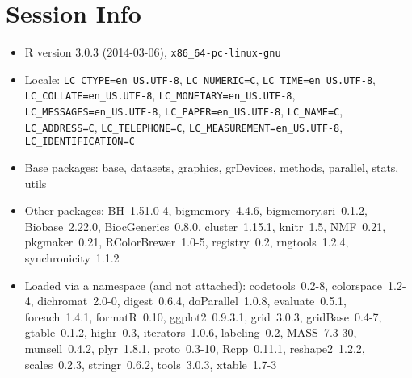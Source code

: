 \documentclass[a4paper]{article}\usepackage[]{graphicx}\usepackage[]{color}
\begin{document}
\section{Session Info}
\begin{itemize}\raggedright
  \item R version 3.0.3 (2014-03-06), \verb|x86_64-pc-linux-gnu|
  \item Locale: \verb|LC_CTYPE=en_US.UTF-8|, \verb|LC_NUMERIC=C|, \verb|LC_TIME=en_US.UTF-8|, \verb|LC_COLLATE=en_US.UTF-8|, \verb|LC_MONETARY=en_US.UTF-8|, \verb|LC_MESSAGES=en_US.UTF-8|, \verb|LC_PAPER=en_US.UTF-8|, \verb|LC_NAME=C|, \verb|LC_ADDRESS=C|, \verb|LC_TELEPHONE=C|, \verb|LC_MEASUREMENT=en_US.UTF-8|, \verb|LC_IDENTIFICATION=C|
  \item Base packages: base, datasets, graphics, grDevices,
    methods, parallel, stats, utils
  \item Other packages: BH~1.51.0-4, bigmemory~4.4.6,
    bigmemory.sri~0.1.2, Biobase~2.22.0, BiocGenerics~0.8.0,
    cluster~1.15.1, knitr~1.5, NMF~0.21, pkgmaker~0.21,
    RColorBrewer~1.0-5, registry~0.2, rngtools~1.2.4,
    synchronicity~1.1.2
  \item Loaded via a namespace (and not attached):
    codetools~0.2-8, colorspace~1.2-4, dichromat~2.0-0,
    digest~0.6.4, doParallel~1.0.8, evaluate~0.5.1, foreach~1.4.1,
    formatR~0.10, ggplot2~0.9.3.1, grid~3.0.3, gridBase~0.4-7,
    gtable~0.1.2, highr~0.3, iterators~1.0.6, labeling~0.2,
    MASS~7.3-30, munsell~0.4.2, plyr~1.8.1, proto~0.3-10,
    Rcpp~0.11.1, reshape2~1.2.2, scales~0.2.3, stringr~0.6.2,
    tools~3.0.3, xtable~1.7-3
\end{itemize}



\printbibliography[heading=bibintoc]
\end{document}
